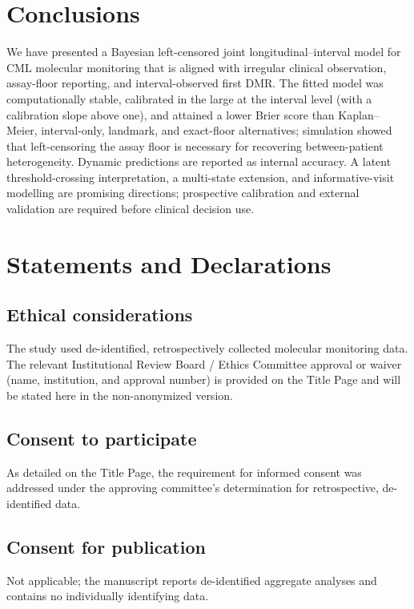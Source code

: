 \documentclass[11pt]{article}
\begin{document}
\section{Conclusions}

We have presented a Bayesian left-censored joint longitudinal--interval
model for CML molecular monitoring that is aligned with irregular clinical
observation, assay-floor reporting, and interval-observed first DMR. The
fitted model was computationally stable, calibrated in the large at the
interval level (with a calibration slope above one), and attained a lower
Brier score than Kaplan--Meier, interval-only,
landmark, and exact-floor alternatives; simulation showed that left-censoring
the assay floor is necessary for recovering between-patient heterogeneity.
Dynamic predictions are reported as internal accuracy. A latent
threshold-crossing interpretation, a multi-state extension, and
informative-visit modelling are promising directions; prospective
calibration and external validation are required before clinical decision
use.

\section*{Statements and Declarations}

\subsection*{Ethical considerations}
The study used de-identified, retrospectively collected molecular
monitoring data. The relevant Institutional Review Board / Ethics
Committee approval or waiver (name, institution, and approval number) is
provided on the Title Page and will be stated here in the non-anonymized
version.

\subsection*{Consent to participate}
As detailed on the Title Page, the requirement for informed consent was
addressed under the approving committee's determination for retrospective,
de-identified data.

\subsection*{Consent for publication}
Not applicable; the manuscript reports de-identified aggregate analyses and
contains no individually identifying data.
\end{document}
